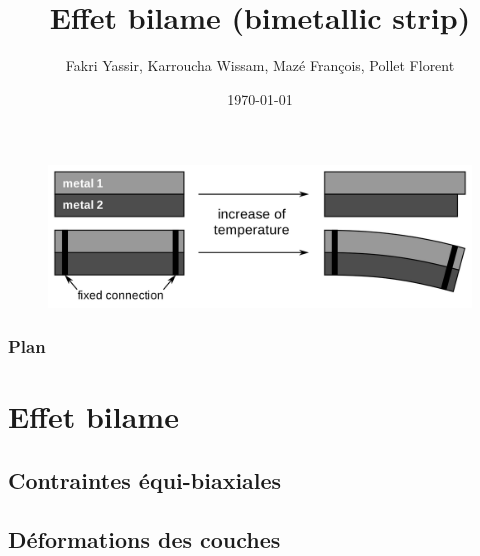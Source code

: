 \documentclass{beamer}
\title[Effet bilame]{Effet bilame (bimetallic strip)}
\author[Groupe 4]{Fakri Yassir, Karroucha Wissam, Mazé François, Pollet Florent} %
\institute[Mines Paris] %
{
Mines ParisTech \\ %
}
\date{\today} %
\begin{document}
\begin{frame}
\titlepage %
\begin{figure}
    \centering
    \includegraphics[scale=0.1]{imgs/bilame.png}
\end{figure}
\end{frame}

\begin{frame}
\frametitle{Plan} %
\tableofcontents %
\end{frame}

\section{Effet bilame} %

\subsection{Contraintes équi-biaxiales} 
\subsection{Déformations des couches} 
\end{document}
